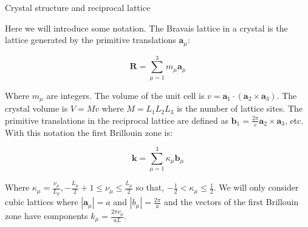 \begin{subappendices}
\begin{section}{Crystal structure and reciprocal lattice}
\label{AP1A}

Here we will introduce some notation. The Bravais lattice in a crystal is the lattice generated by the primitive translations $\textbf{a}_\mu$:

\begin{equation}
\textbf{R} = \sum_{\mu=1}^3 m_\mu \textbf{a}_\mu
\end{equation}

Where $m_\mu$ are integers. The volume of the unit cell is $v = \textbf{a}_1 \cdot (\textbf{a}_2 \times \textbf{a}_3)$. The crystal volume is $V = Mv$ where $M = L_1 L_2 L_3$ is the number of lattice sites. The primitive translations in the reciprocal lattice are defined as $\textbf{b}_1 = \frac{2 \pi}{v}\textbf{a}_2 \times \textbf{a}_3$, etc. With this notation the first Brillouin zone is:

\begin{equation}
\textbf{k} = \sum_{\mu=1}^3 \kappa_\mu \textbf{b}_\mu
\end{equation}

Where $\kappa_\mu = \frac{\nu_\mu}{L_\mu}, -\frac{L_\mu}{2}+1 \leq \nu_\mu \leq \frac{L_\mu}{2}$ so that, $-\frac{1}{2} < \kappa_\mu \leq \frac{1}{2}$. We will only consider cubic lattices where $|\textbf{a}_\mu| = a$ and $|b_\mu| = \frac{2\pi}{a}$ and the vectors of the first Brillouin zone have components $k_\mu = \frac{2 \pi \nu_\mu}{aL}$.

\end{section}
\end{subappendices}

